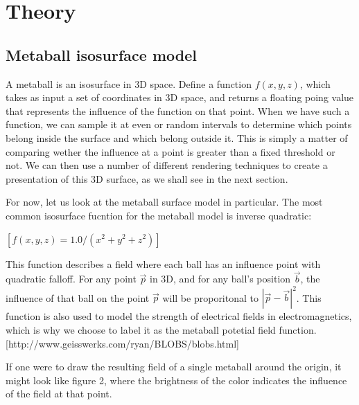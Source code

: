 \documentclass{article}
\begin{document}
    \section{Theory}

        \subsection{Metaball isosurface model}
            A metaball is an isosurface in 3D space. 
            Define a function $f(x,y,z)$, which takes as input a set of coordinates in 3D space, and returns a floating poing value that represents the influence of the function on that point.
            When we have such a function, we can sample it at even or random intervals to determine which points belong inside the surface and which belong outside it.
            This is simply a matter of comparing wether the influence at a point is greater than a fixed threshold or not.
            We can then use a number of different rendering techniques to create a presentation of this 3D surface, as we shall see in the next section.

            For now, let us look at the metaball surface model in particular. The most common isosurface fucntion for the metaball model is inverse quadratic:

            $[f(x,y,z) = 1.0 / (x^2 + y^2 + z^2)]$

            This function describes a field where each ball has an influence point with quadratic falloff.
            For any point $\vec{p}$ in 3D, and for any ball's position $\vec{b}$, the influence of that ball on the point $\vec{p}$ will be proporitonal to $|\vec{p} - \vec{b}|^2$.
            This function is also used to model the strength of electrical fields in electromagnetics, which is why we choose to label it as the metaball potetial field function.
            [http://www.geisswerks.com/ryan/BLOBS/blobs.html]

            If one were to draw the resulting field of a single metaball around the origin, it might look like figure 2, where the brightness of the color indicates the influence of the field at that point.
            
\end{document}
